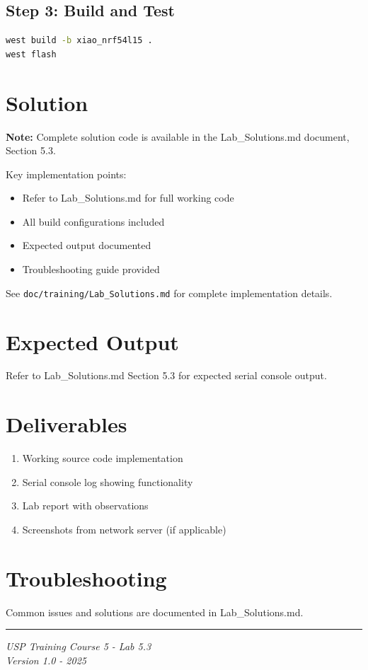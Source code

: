 \documentclass[11pt,a4paper]{article}
\begin{document}
\subsection{Step 3: Build and Test}
\begin{lstlisting}[language=bash]
west build -b xiao_nrf54l15 .
west flash
\end{lstlisting}

\section{Solution}

\begin{solutionbox}
\textbf{Note:} Complete solution code is available in the Lab\_Solutions.md document, Section 5.3.

Key implementation points:
\begin{itemize}
    \item Refer to Lab\_Solutions.md for full working code
    \item All build configurations included
    \item Expected output documented
    \item Troubleshooting guide provided
\end{itemize}

See \texttt{doc/training/Lab\_Solutions.md} for complete implementation details.
\end{solutionbox}

\section{Expected Output}

Refer to Lab\_Solutions.md Section 5.3 for expected serial console output.

\section{Deliverables}

\begin{enumerate}[itemsep=10pt]
    \item Working source code implementation
    \item Serial console log showing functionality
    \item Lab report with observations
    \item Screenshots from network server (if applicable)
\end{enumerate}

\section{Troubleshooting}

Common issues and solutions are documented in Lab\_Solutions.md.

\vfill
\noindent\rule{\textwidth}{0.4pt}
\begin{center}
\textit{USP Training Course 5 - Lab 5.3}\\
\textit{Version 1.0 - 2025}
\end{center}
\end{document}
